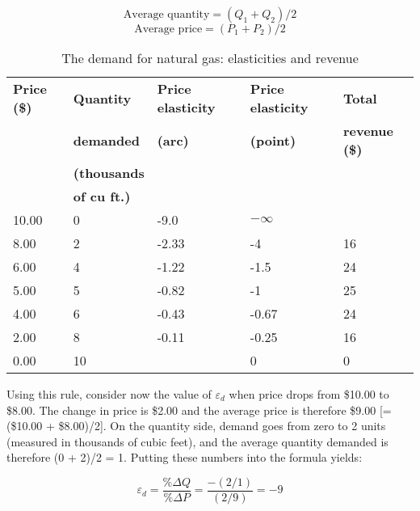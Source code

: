 \begin{equation*}
\text{Average quantity}=(Q_1+Q_2)/2
\end{equation*}
\begin{equation*}
\text{Average price}=(P_1+P_2)/2
\end{equation*}

\begin{table}[H]
\begin{center}
\begin{tabu} to \linewidth {|X[1,c]X[1,c]X[1,c]X[1,c]X[1,c]|} \hline 
{}\textbf{Price (\$)} & \textbf{Quantity} & \textbf{Price elasticity} & \textbf{Price elasticity} & \textbf{Total} \\[-0.5em]
	&	\textbf{demanded}	&	\textbf{(arc)}	&	\textbf{(point)}	&	\textbf{revenue (\$)}	\\[-0.5em]
	&	\textbf{(thousands}	&	&	&	\\[-0.5em]
	&	\textbf{of cu ft.)}	&	&	&	\\
						10.00	&	0 	& -9.0 	& $-\infty$ &  		\\ 
	8.00	&	2 	& -2.33 & -4 		& 16 	\\ 
						6.00	&	4 	& -1.22 & -1.5 		& 24 	\\
	5.00	&	5 	& -0.82 & -1 		& 25 	\\
						4.00	&	6 	& -0.43 & -0.67 	& 24 	\\ 
	2.00	&	8 	& -0.11 & -0.25 	& 16 	\\
						0.00	&	10 	& 		& 0 		& 0 	\\ \hline 
\end{tabu}
\end{center}
\caption{The demand for natural gas: elasticities and revenue \label{table:gaselastrev}}
\end{table}



Using this rule, consider now the value of $\varepsilon_d$ when price drops from \$10.00 to \$8.00. The change in price is \$2.00 and the average price is therefore \$9.00 [= (\$10.00 + \$8.00)/2]. On the quantity side, demand goes from zero to 2 units (measured in thousands of cubic feet), and the average quantity demanded is therefore (0 + 2)/2 = 1. Putting these numbers into the formula yields:

\begin{equation*}
\varepsilon_d=\frac{\%\Delta Q}{\%\Delta P}=\frac{-(2/1)}{(2/9)}=-9
\end{equation*}


